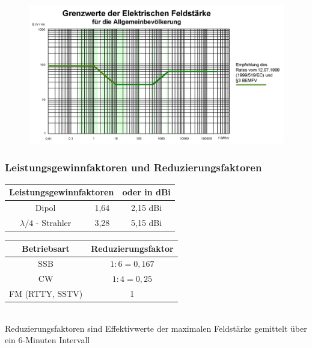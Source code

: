 \begin{frame}
  \begin{figure}
    \includegraphics[width=\textwidth,height=.8\textheight,keepaspectratio]{e18/E_grenzkurve_gr.png}
  \end{figure}
\end{frame}

\begin{frame}
  \frametitle{Leistungsgewinnfaktoren und Reduzierungsfaktoren}
  \begin{tabular}{|c|c|c|}
    \hline
    \multicolumn{2}{|l|}{\textbf{Leistungsgewinnfaktoren}} & \textbf{oder in dBi} \\ \hline
    Dipol & 1,64 & 2,15 dBi \\ \hline
    $\lambda / 4$ - Strahler & 3,28 & 5,15 dBi \\ \hline
  \end{tabular}
  \vspace{0.5cm}

  \begin{tabular}{|c|c|}
    \hline
    \textbf{Betriebsart} & \textbf{Reduzierungsfaktor} \\ \hline
    SSB & $1 : 6 = 0,167$ \\ \hline
    CW & $1 : 4 = 0,25$ \\ \hline
    FM (RTTY, SSTV) & 1 \\ \hline
  \end{tabular}\\[1.5em]
  Reduzierungsfaktoren sind Effektivwerte der maximalen Feldstärke gemittelt über ein 6-Minuten Intervall
\end{frame}

